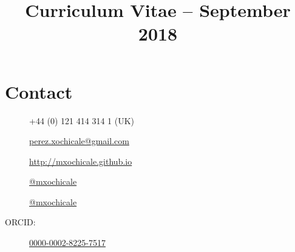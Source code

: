 \documentclass[10pt,a4paper,roman]{moderncv}
\title{Curriculum Vitae -- September 2018}
\begin{document}
%
%
\makecvtitle



%


\vspace{-15mm}


\section{Contact}
%

\begin{changemargin}{2.4cm}{0.5cm}
  \begin{minipage}{.4\textwidth}
    \begin{description}
     \item [\faPhone ]    +44 (0) 121 414 314 1 (UK)
     \item[\faEnvelope]  \href{mailto:perez.xochicale@gmail.com}{perez.xochicale@gmail.com}
     \item[\faHome]  \href{http://mxochicale.github.io}{http://mxochicale.github.io}
     \end{description}
  \end{minipage}
  \begin{minipage}{.4\textwidth}
  \begin{description}
   \item[\faTwitter ] \href{https://twitter.com/_mxochicale}{@\textunderscore mxochicale}
   \item[\faGithub]  \href{https://github.com/mxochicale}{@mxochicale}
   \item[ORCID:] \href{http://orcid.org/0000-0002-8225-7517}{0000-0002-8225-7517}
   \end{description}
  \end{minipage}
\end{changemargin}
\end{document}
